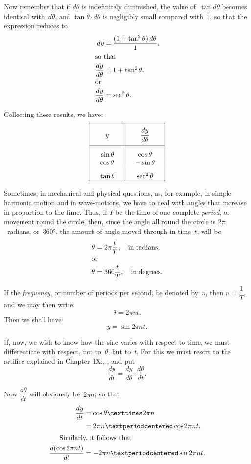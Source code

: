 \documentclass[12pt]{book}[2005/09/16]
\newcommand{\DPPageSep}[2]{\Pagelabel{#2}}
\newcommand{\Pagelabel}[1]
  {\phantomsection\label{#1}}
\newcommand{\Pageref}[2][p.]{%
  \ifthenelse{\not\equal{#1}{}}{%
    \hyperref[#2]{#1~\pageref{#2}}%
  }{%
    \hyperref[#2]{\pageref{#2}}%
  }%
}
\newcommand{\DStrut}{\rule[-12pt]{0pt}{32pt}}
\newcommand{\Strut}{\rule{0pt}{16pt}}
\begin{document}
Now remember that if $d\theta$ is indefinitely diminished,
the value of~$\tan d\theta$ becomes identical with~$d\theta$, and
$\tan\theta · d\theta$ is negligibly small compared with~$1$, so that
the expression reduces to
\begin{align*}
dy &= \frac{(1+\tan^2 \theta)\, d\theta}{1}, \\
\intertext{so that}
\frac{dy}{d\theta} &= 1 + \tan^2\theta, \\
\intertext{or}
\frac{dy}{d\theta} &= \sec^2 \theta.
\end{align*}

Collecting these results, we have:
\[
\begin{array}{|*{2}{>{\quad}c<{\quad}|}}
\hline
\DStrut y   & \dfrac{dy}{d\theta} \\
\hline
\Strut\sin\theta & \cos\theta \\
\cos\theta & -\sin\theta \\
\Strut\tan\theta & \sec^2 \theta\\
\hline
\end{array}
\]

Sometimes, in mechanical and physical questions,
as, for example, in simple harmonic motion and in
wave-motions, we have to deal with angles that increase
in proportion to the time. Thus, if $T$ be the
time of one complete \emph{period}, or movement round the
circle, then, since the angle all round the circle is $2\pi$~radians,
or~$360°$, the amount of angle moved through
in time~$t$, will be
\begin{align*}
\theta &= 2\pi\frac{t}{T},\quad \text{in radians,} \\
\intertext{or}
\theta &= 360\frac{t}{T},\quad \text{in degrees.}
\end{align*}
\DPPageSep{182.png}{170}%

If the \emph{frequency}, or number of periods per second,
be denoted by~$n$, then $n = \dfrac{1}{T}$, and we may then write:
\[
\theta=2\pi nt.
\]
Then we shall have
\[
y = \sin 2\pi nt.
\]

If, now, we wish to know how the sine varies with
respect to time, we must differentiate with respect, not
to~$\theta$, but to~$t$. For this we must resort to the artifice
explained in Chapter~IX., \Pageref{chap:IX}, and put %
\[
\frac{dy}{dt} = \frac{dy}{d\theta} · \frac{d\theta}{dt}.
\]

Now $\dfrac{d\theta}{dt}$ will obviously be~$2\pi n$; so that
\begin{align*}
\frac{dy}{dt} &= \cos \theta × 2\pi n \\
              &= 2\pi n · \cos 2\pi nt. \\
\intertext{\indent Similarly, it follows that}
\frac{d(\cos 2\pi nt)}{dt} &= -2\pi n · \sin 2\pi nt.
\end{align*}
\end{document}

